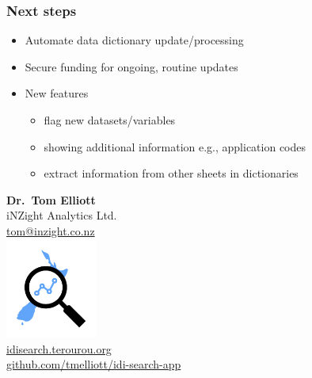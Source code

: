 \documentclass[aspectratio=169]{beamer}
\begin{document}
\begin{frame}
    \frametitle{Next steps}

    \begin{itemize}
        \item Automate data dictionary update/processing
        \item Secure funding for ongoing, routine updates
        \item New features
        \begin{itemize}
            \item flag new datasets/variables
            \item showing additional information e.g., application codes
            \item extract information from other sheets in dictionaries
        \end{itemize}
    \end{itemize}
\end{frame}

\begin{frame}
    \begin{center}
        \textbf{Dr.~Tom Elliott}\\
        iNZight Analytics Ltd.\\
        \url{tom@inzight.co.nz} \\[2em]
        \includegraphics[width=3cm]{idisearch}\\
        \url{idisearch.terourou.org}\\
        \url{github.com/tmelliott/idi-search-app}
    \end{center}
\end{frame}
\end{document}
